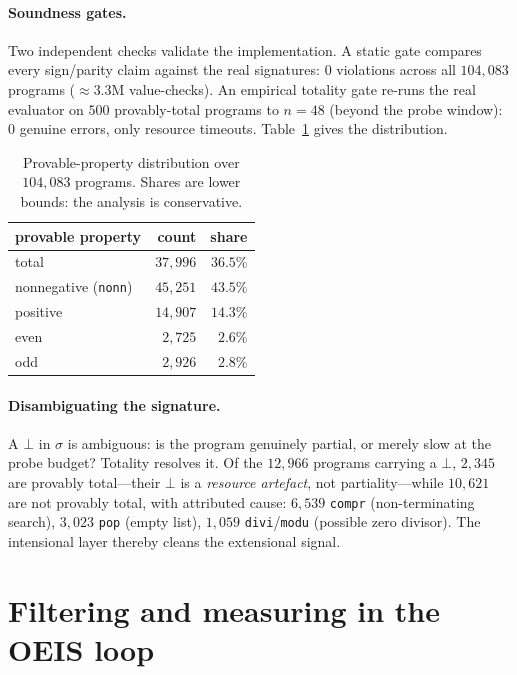\documentclass[11pt]{article}
\newcommand{\code}[1]{\texttt{#1}}
\newcommand{\sig}{\ensuremath{\sigma}}
\begin{document}
\paragraph{Soundness gates.} Two independent checks validate the implementation. A static
gate compares every sign/parity claim against the real signatures: $0$ violations across
all $104{,}083$ programs ($\approx 3.3$M value-checks). An empirical totality gate re-runs
the real evaluator on $500$ provably-total programs to $n=48$ (beyond the probe window):
$0$ genuine errors, only resource timeouts. Table~\ref{tab:props} gives the distribution.

\begin{table}[t]
\centering
\begin{tabular}{@{}lrr@{}}
\toprule
provable property & count & share \\
\midrule
total          & $37{,}996$ & $36.5\%$ \\
nonnegative (\code{nonn}) & $45{,}251$ & $43.5\%$ \\
positive       & $14{,}907$ & $14.3\%$ \\
even           & $2{,}725$  & $2.6\%$ \\
odd            & $2{,}926$  & $2.8\%$ \\
\bottomrule
\end{tabular}
\caption{Provable-property distribution over $104{,}083$ programs. Shares are lower bounds:
the analysis is conservative.}
\label{tab:props}
\end{table}

\paragraph{Disambiguating the signature.} A $\bot$ in \sig{} is ambiguous: is the program
genuinely partial, or merely slow at the probe budget? Totality resolves it. Of the
$12{,}966$ programs carrying a $\bot$, $2{,}345$ are provably total---their $\bot$ is a
\emph{resource artefact}, not partiality---while $10{,}621$ are not provably total, with
attributed cause: $6{,}539$ \code{compr} (non-terminating search), $3{,}023$ \code{pop}
(empty list), $1{,}059$ \code{divi}/\code{modu} (possible zero divisor). The intensional
layer thereby cleans the extensional signal.

\section{Filtering and measuring in the OEIS loop}
\label{sec:filter}
\end{document}
